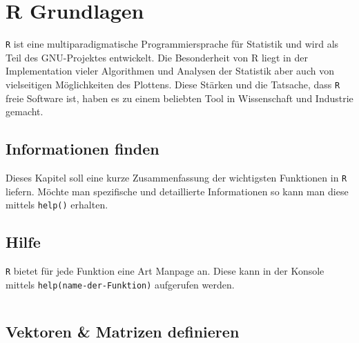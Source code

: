 



\chapter{R Grundlagen}
\lstinline{R} ist eine multiparadigmatische Programmiersprache für 
Statistik und wird als Teil des GNU-Projektes entwickelt. Die 
Besonderheit von R liegt in der Implementation vieler Algorithmen
und Analysen der Statistik aber auch von vielseitigen Möglichkeiten 
des Plottens. Diese Stärken und die Tatsache, dass \lstinline{R} 
freie Software ist, haben es zu einem beliebten Tool in Wissenschaft
und Industrie gemacht.

\newpage


\section*{Informationen finden}
Dieses Kapitel soll eine kurze Zusammenfassung der wichtigsten 
Funktionen in \lstinline{R} liefern. Möchte man spezifische und
detaillierte Informationen so kann man diese mittels \lstinline{help()}
erhalten. 

\section{Hilfe}
\lstinline{R} bietet für jede Funktion eine Art Manpage an. 
Diese kann in der Konsole mittels \lstinline{help(name-der-Funktion)}
aufgerufen werden. 

\begin{lstlisting}

\end{lstlisting}

\section{Vektoren \& Matrizen definieren}
